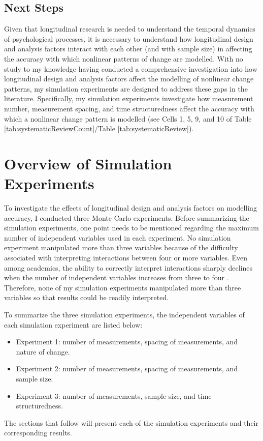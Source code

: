 \documentclass[
12pt, %
twoside,
english]{guelphthesis}
\begin{document}
\hypertarget{next-steps}{%
\subsection{Next Steps}\label{next-steps}}

Given that longitudinal research is needed to understand the temporal dynamics of psychological processes, it is necessary to understand how longitudinal design and analysis factors interact with each other (and with sample size) in affecting the accuracy with which nonlinear patterns of change are modelled. With no study to my knowledge having conducted a comprehensive investigation into how longitudinal design and analysis factors affect the modelling of nonlinear change patterns, my simulation experiments are designed to address these gaps in the literature. Specifically, my simulation experiments investigate how measurement number, measurement spacing, and time structuredness affect the accuracy with which a nonlinear change pattern is modelled (see Cells 1, 5, 9, and 10 of Table \ref{tab:systematicReviewCount}/Table \ref{tab:systematicReview}).

\hypertarget{overview-of-simulation-experiments}{%
\section{Overview of Simulation Experiments}\label{overview-of-simulation-experiments}}

To investigate the effects of longitudinal design and analysis factors on modelling accuracy, I conducted three Monte Carlo experiments. Before summarizing the simulation experiments, one point needs to be mentioned regarding the maximum number of independent variables used in each experiment. No simulation experiment manipulated more than three variables because of the difficulty associated with interpreting interactions between four or more variables. Even among academics, the ability to correctly interpret interactions sharply declines when the number of independent variables increases from three to four \autocite{halford2005}. Therefore, none of my simulation experiments manipulated more than three variables so that results could be readily interpreted.

To summarize the three simulation experiments, the independent variables of each simulation experiment are listed below:
\begin{itemize}
\tightlist
\item
  Experiment 1: number of measurements, spacing of measurements, and nature of change.
\item
  Experiment 2: number of measurements, spacing of measurements, and sample size.
\item
  Experiment 3: number of measurements, sample size, and time structuredness.
\end{itemize}
\noindent The sections that follow will present each of the simulation experiments and their corresponding results.
\end{document}
